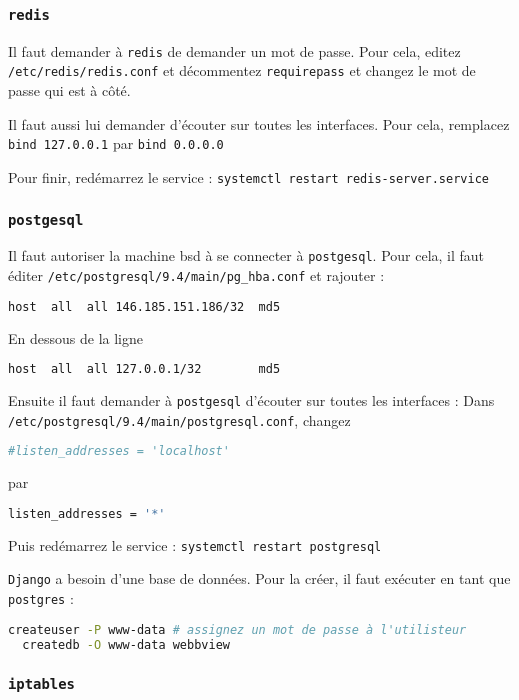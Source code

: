 \documentclass[10pt,a4paper]{article}
\begin{document}
\subsubsection{\texttt{redis}}

Il faut demander à \texttt{redis} de demander un mot de passe.
Pour cela, editez \texttt{/etc/redis/redis.conf} et décommentez \texttt{requirepass}
et changez le mot de passe qui est à côté.

Il faut aussi lui demander d'écouter sur toutes les interfaces.
Pour cela, remplacez \texttt{bind 127.0.0.1} par \texttt{bind 0.0.0.0}

Pour finir, redémarrez le service : \texttt{systemctl restart redis-server.service}


\subsubsection{\texttt{postgesql}}

Il faut autoriser la machine bsd à se connecter à \texttt{postgesql}.
Pour cela, il faut éditer \texttt{/etc/postgresql/9.4/main/pg\_hba.conf} et rajouter :
\begin{lstlisting}[language=bash]
  host  all  all 146.185.151.186/32  md5
\end{lstlisting}
En dessous de la ligne
\begin{lstlisting}[language=bash]
  host  all  all 127.0.0.1/32        md5
\end{lstlisting}

Ensuite il faut demander à \texttt{postgesql} d'écouter sur toutes les interfaces :
Dans \texttt{/etc/postgresql/9.4/main/postgresql.conf}, changez
\begin{lstlisting}[language=bash]
  #listen_addresses = 'localhost'
\end{lstlisting}
par
\begin{lstlisting}[language=bash]
  listen_addresses = '*'
\end{lstlisting}

Puis redémarrez le service : \texttt{systemctl restart postgresql}

\texttt{Django} a besoin d'une base de données.
Pour la créer, il faut exécuter en tant que \texttt{postgres} :
\begin{lstlisting}[language=bash]
  createuser -P www-data # assignez un mot de passe à l'utilisteur
  createdb -O www-data webbview
\end{lstlisting}

\subsubsection{\texttt{iptables}}
\end{document}
